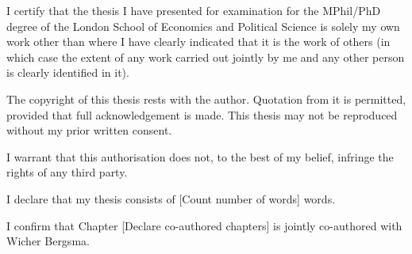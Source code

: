I certify that the thesis I have presented for examination for the MPhil/PhD degree of the London School of Economics and Political Science is solely my own work other than where I have clearly indicated that it is the work of others (in which case the extent of any work carried out jointly by me and any other person is clearly identified in it).

The copyright of this thesis rests with the author. Quotation from it is permitted, provided that full acknowledgement is made. This thesis may not be reproduced without my prior written consent.

I warrant that this authorisation does not, to the best of my belief, infringe the rights of any third party.

I declare that my thesis consists of [Count number of words] words.

I confirm that Chapter [Declare co-authored chapters] is jointly co-authored with Wicher Bergsma.
